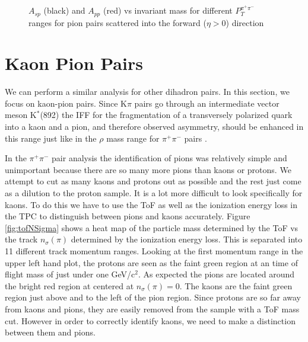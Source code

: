 \documentclass[abstract = on,listof=totoc, bibliography=totoc]{scrreprt}
\newcommand{\ptpair}{P_{T}^{\pi^+\pi^-}}
\newcommand{\pip}{\pi^+}
\newcommand{\pim}{\pi^-}
\newcommand{\pair}{$\pip\pim$ }
\newcommand{\nsigpi}{n_\sigma(\pi)}
\begin{document}
\begin{figure}
\begin{tabular}{cc}
\end{tabular}
\caption{$A_{sp}$ (black) and $A_{pp}$ (red) vs invariant mass for different $\ptpair$ ranges for pion pairs scattered into the forward ($\eta > 0$) direction}
\label{fig:partWaveFits}
\end{figure}






\section{Kaon Pion Pairs}

We can perform a similar analysis for other dihadron pairs. In this section, we focus on kaon-pion pairs. Since K$\pi$ pairs go through an intermediate vector meson K$^*$(892) the IFF for the fragmentation of a transversely polarized quark into a kaon and a pion, and therefore observed asymmetry, should be enhanced in this range just like in the $\rho$ mass range for \pair pairs \cite{PhysRevLett.80.1166}. 

In the \pair pair analysis the identification of pions was relatively simple and unimportant because there are so many more pions than kaons or protons. We attempt to cut as many kaons and protons out as possible and the rest just come as a dilution to the proton sample. It is a lot more difficult to look specifically for kaons. To do this we have to use the ToF as well as the ionization energy loss in the TPC to distinguish between pions and kaons accurately. Figure \ref{fig:tofNSigma} shows a heat map of the particle mass determined by the ToF vs the track $\nsigpi$ determined by the ionization energy loss. This is separated into 11 different track momentum ranges. Looking at the first momentum range in the upper left hand plot, the protons are seen as the faint green region at an time of flight mass of just under one GeV/c$^2$. As expected the pions are located around the bright red region at centered at $\nsigpi = 0$. The kaons are the faint green region just above and to the left of the pion region. Since protons are so far away from kaons and pions, they are easily removed from the sample with a ToF mass cut. However in order to correctly identify kaons, we need to make a distinction between them and pions. 
\end{document}
